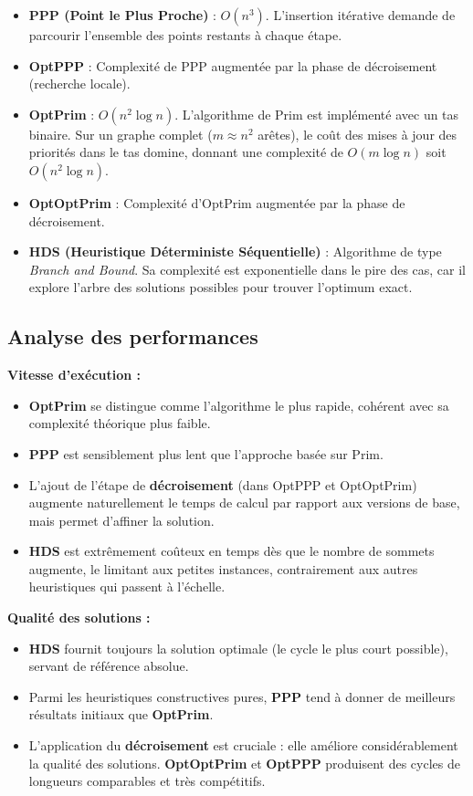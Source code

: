 \documentclass[a4paper, 12pt]{article}
\begin{document}
\begin{itemize}
    \item \textbf{PPP (Point le Plus Proche)} : $O(n^3)$. L'insertion itérative demande de parcourir l'ensemble des points restants à chaque étape.
    \item \textbf{OptPPP} : Complexité de PPP augmentée par la phase de décroisement (recherche locale).
    \item \textbf{OptPrim} : $O(n^2 \log n)$. L'algorithme de Prim est implémenté avec un tas binaire. Sur un graphe complet ($m \approx n^2$ arêtes), le coût des mises à jour des priorités dans le tas domine, donnant une complexité de $O(m \log n)$ soit $O(n^2 \log n)$.
    \item \textbf{OptOptPrim} : Complexité d'OptPrim augmentée par la phase de décroisement.
    \item \textbf{HDS (Heuristique Déterministe Séquentielle)} : Algorithme de type \textit{Branch and Bound}. Sa complexité est exponentielle dans le pire des cas, car il explore l'arbre des solutions possibles pour trouver l'optimum exact.
\end{itemize}

\subsection{Analyse des performances}

\textbf{Vitesse d'exécution :}
\begin{itemize}
    \item \textbf{OptPrim} se distingue comme l'algorithme le plus rapide, cohérent avec sa complexité théorique plus faible.
    \item \textbf{PPP} est sensiblement plus lent que l'approche basée sur Prim.
    \item L'ajout de l'étape de \textbf{décroisement} (dans OptPPP et OptOptPrim) augmente naturellement le temps de calcul par rapport aux versions de base, mais permet d'affiner la solution.
    \item \textbf{HDS} est extrêmement coûteux en temps dès que le nombre de sommets augmente, le limitant aux petites instances, contrairement aux autres heuristiques qui passent à l'échelle.
\end{itemize}

\textbf{Qualité des solutions :}
\begin{itemize}
    \item \textbf{HDS} fournit toujours la solution optimale (le cycle le plus court possible), servant de référence absolue.
    \item Parmi les heuristiques constructives pures, \textbf{PPP} tend à donner de meilleurs résultats initiaux que \textbf{OptPrim}.
    \item L'application du \textbf{décroisement} est cruciale : elle améliore considérablement la qualité des solutions. \textbf{OptOptPrim} et \textbf{OptPPP} produisent des cycles de longueurs comparables et très compétitifs.
\end{itemize}
\end{document}
